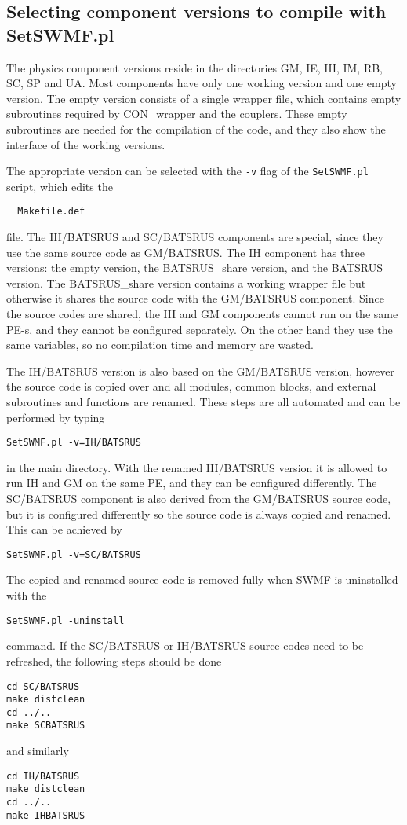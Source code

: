 \subsection{Selecting component versions to compile with SetSWMF.pl}

The physics component versions reside in the directories 
GM, IE, IH, IM, RB, SC,
SP and UA.
Most components have only one working version and one empty version.
The empty version consists of a single wrapper file, which contains 
empty subroutines required by CON\_wrapper and the couplers.
These empty subroutines are needed for the compilation of the code,
and they also show the interface of the working versions.

The appropriate version can be selected with the {\tt -v} flag
of the {\tt SetSWMF.pl} script, which edits the
\begin{verbatim}
  Makefile.def
\end{verbatim}
file. The IH/BATSRUS and SC/BATSRUS components are special, since they use the
same source code as GM/BATSRUS. The IH component has three versions: 
the empty version, the BATSRUS\_share version, and the BATSRUS version. 
The BATSRUS\_share version contains a working wrapper file but otherwise 
it shares the source code
with the GM/BATSRUS component. Since the source codes are shared, the
IH and GM components cannot run on the same PE-s, and they cannot be
configured separately. On the other hand they use the same variables,
so no compilation time and memory are wasted.

The IH/BATSRUS version is also based on the GM/BATSRUS version, however
the source code is copied over and all modules, common blocks,
and external subroutines and functions are renamed. 
These steps are all automated and can be performed by typing
\begin{verbatim}
SetSWMF.pl -v=IH/BATSRUS
\end{verbatim}
in the main directory. With the renamed IH/BATSRUS version it is allowed 
to run IH and GM on the same PE, and they can be configured differently.
The SC/BATSRUS component is also derived from the GM/BATSRUS source code,
but it is configured differently so the source code is always copied
and renamed. This can be achieved by
\begin{verbatim}
SetSWMF.pl -v=SC/BATSRUS
\end{verbatim}
The copied and renamed source code is removed fully when SWMF is
uninstalled with the
\begin{verbatim}
SetSWMF.pl -uninstall
\end{verbatim}
command. If the SC/BATSRUS or IH/BATSRUS source codes need to be
refreshed, the following steps should be done
\begin{verbatim}
cd SC/BATSRUS
make distclean
cd ../..
make SCBATSRUS
\end{verbatim}
and similarly
\begin{verbatim}
cd IH/BATSRUS
make distclean
cd ../..
make IHBATSRUS
\end{verbatim}

